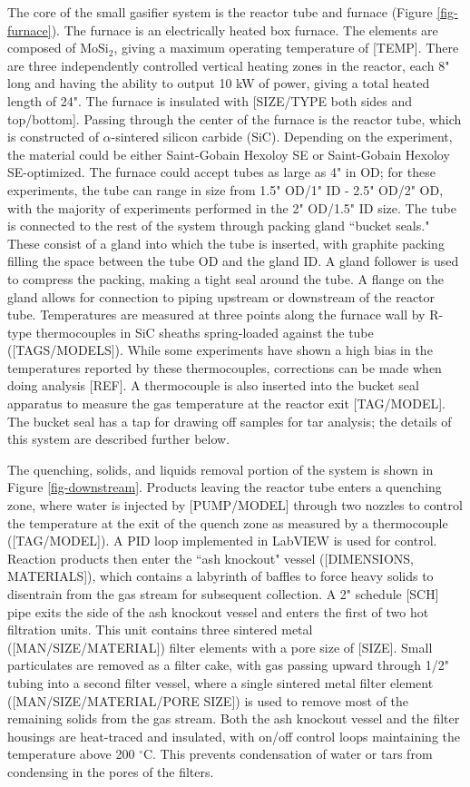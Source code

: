 \documentclass[11pt,twocolumn]{article}
\begin{document}
The core of the small gasifier system is the reactor tube and furnace (Figure \ref{fig-furnace}).  The furnace is an electrically heated box furnace.  The elements are composed of MoSi$_2$, giving a maximum operating temperature of [TEMP].  There are three independently controlled vertical heating zones in the reactor, each 8" long and having the ability to output 10 kW of power, giving a total heated length of 24".  The furnace is insulated with [SIZE/TYPE both sides and top/bottom].  Passing through the center of the furnace is the reactor tube, which is constructed of $\alpha$-sintered silicon carbide (SiC).  Depending on the experiment, the material could be either Saint-Gobain Hexoloy SE or Saint-Gobain Hexoloy SE-optimized.  The furnace could accept tubes as large as 4" in OD; for these experiments, the tube can range in size from 1.5" OD/1" ID - 2.5" OD/2" OD, with the majority of experiments performed in the 2" OD/1.5" ID size.  The tube is connected to the rest of the system through packing gland ``bucket seals."  These consist of a gland into which the tube is inserted, with graphite packing filling the space between the tube OD and the gland ID.  A gland follower is used to compress the packing, making a tight seal around the tube.  A flange on the gland allows for connection to piping upstream or downstream of the reactor tube.  Temperatures are measured at three points along the furnace wall by R-type thermocouples in SiC sheaths spring-loaded against the tube ([TAGS/MODELS]).  While some experiments have shown a high bias in the temperatures reported by these thermocouples, corrections can be made when doing analysis [REF].  A thermocouple is also inserted into the bucket seal apparatus to measure the gas temperature at the reactor exit [TAG/MODEL].  The bucket seal has a tap for drawing off samples for tar analysis; the details of this system are described further below.

The quenching, solids, and liquids removal portion of the system is shown in Figure \ref{fig-downstream}.  Products leaving the reactor tube enters a quenching zone, where water is injected by [PUMP/MODEL] through two nozzles to control the temperature at the exit of the quench zone as measured by a thermocouple ([TAG/MODEL]).  A PID loop implemented in LabVIEW is used for control.  Reaction products then enter the ``ash knockout" vessel ([DIMENSIONS, MATERIALS]), which contains a labyrinth of baffles to force heavy solids to disentrain from the gas stream for subsequent collection.  A 2" schedule [SCH] pipe exits the side of the ash knockout vessel and enters the first of two hot filtration units.  This unit contains three sintered metal ([MAN/SIZE/MATERIAL]) filter elements with a pore size of [SIZE].  Small particulates are removed as a filter cake, with gas passing upward through 1/2" tubing into a second filter vessel, where a single sintered metal filter element ([MAN/SIZE/MATERIAL/PORE SIZE]) is used to remove most of the remaining solids from the gas stream.  Both the ash knockout vessel and the filter housings are heat-traced and insulated, with on/off control loops maintaining the temperature above 200 $^{\circ}$C.  This prevents condensation of water or tars from condensing in the pores of the filters.
\end{document}
